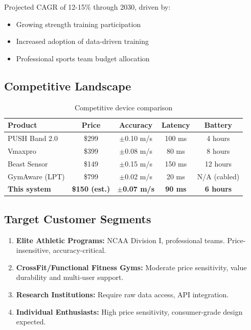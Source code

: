 Projected CAGR of 12-15\% through 2030, driven by:
\begin{itemize}
    \item Growing strength training participation
    \item Increased adoption of data-driven training
    \item Professional sports team budget allocation
\end{itemize}

\subsection{Competitive Landscape}

\begin{table}[h]
    \centering
    \caption{Competitive device comparison}
    \label{tab:competitors}
    \begin{tabular}{lcccc}
        \toprule
        \textbf{Product} & \textbf{Price} & \textbf{Accuracy} & \textbf{Latency} & \textbf{Battery} \\
        \midrule
        PUSH Band 2.0 & \$299 & $\pm$0.10 m/s & 100 ms & 4 hours \\
        Vmaxpro & \$399 & $\pm$0.08 m/s & 80 ms & 8 hours \\
        Beast Sensor & \$149 & $\pm$0.15 m/s & 150 ms & 12 hours \\
        GymAware (LPT) & \$799 & $\pm$0.02 m/s & 20 ms & N/A (cabled) \\
        \midrule
        \textbf{This system} & \textbf{\$150 (est.)} & \textbf{$\pm$0.07 m/s} & \textbf{90 ms} & \textbf{6 hours} \\
        \bottomrule
    \end{tabular}
\end{table}

\subsection{Target Customer Segments}

\begin{enumerate}
    \item \textbf{Elite Athletic Programs:} NCAA Division I, professional teams. Price-insensitive, accuracy-critical.
    \item \textbf{CrossFit/Functional Fitness Gyms:} Moderate price sensitivity, value durability and multi-user support.
    \item \textbf{Research Institutions:} Require raw data access, API integration.
    \item \textbf{Individual Enthusiasts:} High price sensitivity, consumer-grade design expected.
\end{enumerate}

